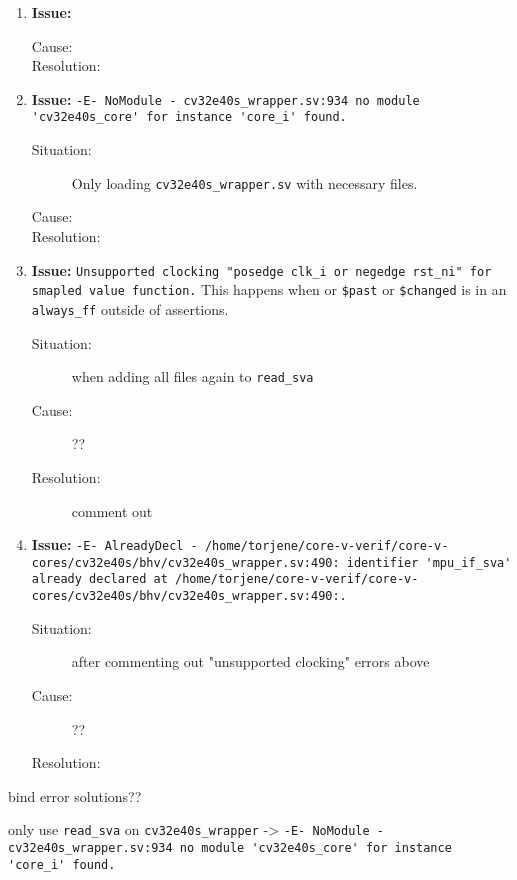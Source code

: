 \begin{enumerate}
\item \textbf{Issue:} 
  \begin{description}
    \item[Cause:] 
    \item[Resolution:] 
  \end{description}
  
\item \textbf{Issue:}  \lstinline{-E- NoModule - cv32e40s_wrapper.sv:934 no module 'cv32e40s_core' for instance 'core_i' found.}
  \begin{description}
    \item[Situation:] Only loading \lstinline{cv32e40s_wrapper.sv} with necessary files.
    \item[Cause:] 
    \item[Resolution:] 
  \end{description}
 
 

\item \textbf{Issue:} \lstinline{Unsupported clocking "posedge clk_i or negedge rst_ni" for smapled value function.} This happens when  or \lstinline{$past} or \lstinline{$changed} is in an \lstinline{always_ff} outside of assertions.
  \begin{description}
    \item[Situation:] when adding all files again to \lstinline{read_sva}
    \item[Cause:] ??
    \item[Resolution:] comment out 
  \end{description}
  
\item \textbf{Issue:} \lstinline{-E- AlreadyDecl - /home/torjene/core-v-verif/core-v-cores/cv32e40s/bhv/cv32e40s_wrapper.sv:490: identifier 'mpu_if_sva' already declared at /home/torjene/core-v-verif/core-v-cores/cv32e40s/bhv/cv32e40s_wrapper.sv:490:.}
  \begin{description}
    \item[Situation:] after commenting out "unsupported clocking" errors above
    \item[Cause:] ??
    \item[Resolution:] 
  \end{description}

  
\end{enumerate}

bind error solutions??

only use \lstinline{read_sva} on \lstinline{cv32e40s_wrapper} -> \lstinline{-E- NoModule - cv32e40s_wrapper.sv:934 no module 'cv32e40s_core' for instance 'core_i' found.}

